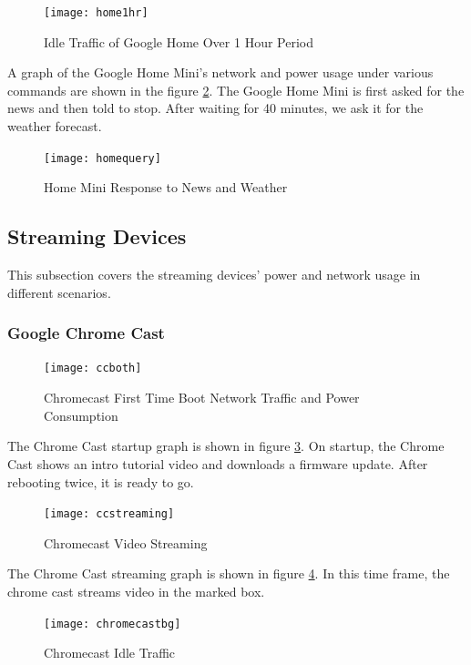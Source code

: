 \begin{figure}[H]
  \centering
    \texttt{[image: home1hr]}
  \caption{Idle Traffic of Google Home Over 1 Hour Period}
  \label{fig:home}
\end{figure}

A graph of the Google Home Mini's network and power usage under various commands are shown in the figure \ref{fig:homequery}. The Google Home Mini is first asked for the news and then told to stop. After waiting for 40 minutes, we ask it for the weather forecast.

\begin{figure}[H]
  \centering
    \texttt{[image: homequery]}
  \caption{Home Mini Response to News and Weather}
  \label{fig:homequery}
\end{figure}

\subsection{Streaming Devices}
\label{Streaming Devices}
This subsection covers the streaming devices' power and network usage in different scenarios.

\subsubsection{Google Chrome Cast}
\begin{figure}[H]
  \centering
  \texttt{[image: ccboth]}
  \caption{Chromecast First Time Boot Network Traffic and Power Consumption}
  \label{fig:ccboth}
\end{figure}

The Chrome Cast startup graph is shown in figure \ref{fig:ccboth}. On startup, the Chrome Cast shows an intro tutorial video and downloads a firmware update. After rebooting twice, it is ready to go.

\begin{figure}[H]
  \centering
  \texttt{[image: ccstreaming]}
  \caption{Chromecast Video Streaming}
  \label{fig:ccstream}
\end{figure}

The Chrome Cast streaming graph is shown in figure \ref{fig:ccstream}. In this time frame, the chrome cast streams video in the marked box.

\begin{figure}[H]
  \centering
  \texttt{[image: chromecastbg]}
  \caption{Chromecast Idle Traffic}
  \label{fig:ccbg}
\end{figure}

